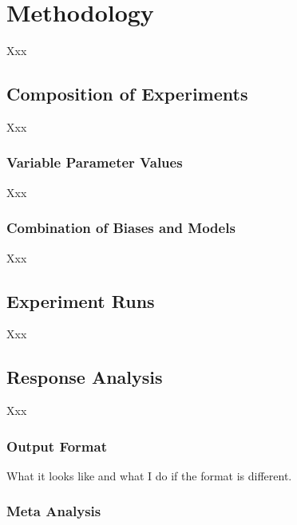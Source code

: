 \section{Methodology}
Xxx

\subsection{Composition of Experiments}
Xxx

\subsubsection{Variable Parameter Values}
Xxx

\subsubsection{Combination of Biases and Models}
Xxx

\subsection{Experiment Runs}
Xxx

\subsection{Response Analysis}
Xxx

\subsubsection{Output Format}
What it looks like and what I do if the format is different.

\subsubsection{Meta Analysis}